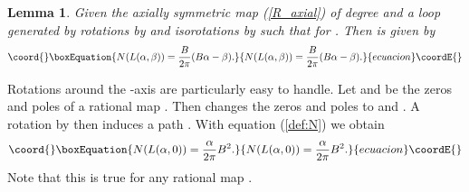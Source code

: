 \documentclass[a4paper,12pt]{article}
\newtheorem {lemma}[theorem]{Lemma}
\begin{document}
\begin{lemma} 
\label{l:Naxial}
Given the axially symmetric map {\rm (\ref{R_axial})} of degree \coordHE{}
and a loop generated by rotations by \myHighlight{$\alpha$}\coordHE{} and isorotations by \myHighlight{$\beta$}\coordHE{} 
such that \mbox{\coordHE{}} for \coordHE{}. Then 
\coordHE{} is given by 
\begin{equation}\coord{}\boxEquation{
\label{Naxial}
N(L(\alpha, \beta)) = \frac{B}{2 \pi} (B \alpha - \beta).
}{
N(L(\alpha, \beta)) = \frac{B}{2 \pi} (B \alpha - \beta).
}{ecuacion}\coordE{}\end{equation}
\end{lemma}

Rotations around the \coordHE{}-axis are particularly easy to handle. Let 
\coordHE{} and \coordHE{} be the zeros and poles of a rational map \coordHE{}. Then \coordHE{}  changes the zeros and poles to \coordHE{} and  \coordHE{}. A 
rotation by \myHighlight{$\alpha$}\coordHE{} then induces a path \coordHE{}. 
With equation (\ref{def:N}) we 
obtain 
%
\begin{equation}\coord{}\boxEquation{
N (L(\alpha, 0)) = \frac{\alpha}{2 \pi} B^2.
}{
N (L(\alpha, 0)) = \frac{\alpha}{2 \pi} B^2.
}{ecuacion}\coordE{}\end{equation}
%
Note that this is true for any rational map \coordHE{}.
\end{document}
